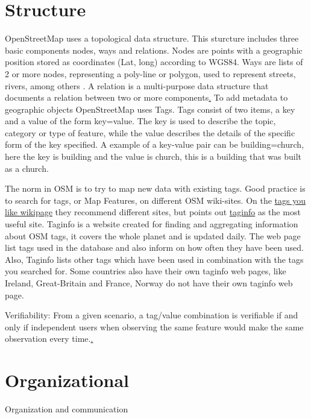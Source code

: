 \section{Structure}
OpenStreetMap uses a topological data structure. This sturcture includes three basic components nodes, ways and relations. Nodes are points with a geographic position stored as coordinates (Lat, long) according to WGS84. Ways are lists of 2 or more nodes, representing a poly-line or polygon, used to represent streets, rivers, among others \cite{Debruyne2015}. A relation is a multi-purpose data structure that documents a relation between two or more components\href{https://wiki.openstreetmap.org/wiki/Elements}. To add metadata to geographic objects OpenStreetMap uses Tags. Tags consist of two items, a key and a value of the form key=value. The key is used to describe the topic, category or type of feature, while the value describes the details of the specific form of the key specified. A example of a key-value pair can be building=church, here the key is building and the value is church, this is a building that was built as a church. 

The norm in OSM is to try to map new data with existing tags. Good practice is to search for tags, or Map Features, on different OSM wiki-sites. On the \href{http://wiki.openstreetmap.org/wiki/Any_tags_you_like}{tags you like wikipage} they recommend different sites, but points out \href{http://taginfo.openstreetmap.org/}{taginfo} as the most useful site. Taginfo is a website created for finding and aggregating information about OSM tags, it covers the whole planet and is updated daily. The web page list tags used in the database and also inform on how often they have been used. Also, Taginfo lists other tags which have been used in combination with the tags you searched for. Some countries also have their own taginfo web pages, like Ireland, Great-Britain and France, Norway do not have their own taginfo web page. 

Verifiability: From a given scenario, a tag/value combination is verifiable if and only if independent users when observing the same feature would make the same observation every time.\href{http://wiki.openstreetmap.org/wiki/Verifiability}. 

\section{Organizational}
Organization and communication 

